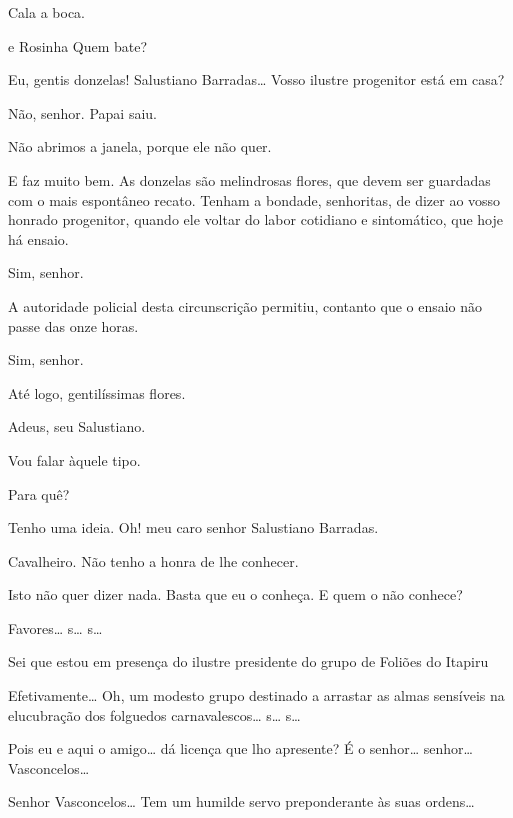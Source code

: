 \begin{linenumbers}
 Cala a boca.

 e {Rosinha}  
Quem bate?

 Eu, gentis
donzelas! Salustiano Barradas\ldots{} Vosso ilustre
progenitor está em casa?

 Não, senhor.
Papai saiu.

 Não abrimos a janela, porque ele
não quer.

 E faz muito
bem. As donzelas são melindrosas flores, que devem
ser guardadas com o mais espontâneo recato. Tenham a
bondade, senhoritas, de dizer ao vosso honrado progenitor, quando ele
voltar do labor cotidiano e sintomático, que hoje
há ensaio.

 Sim,
senhor.

 A autoridade
policial desta circunscrição permitiu, contanto que o
ensaio não passe das onze horas.

 Sim,
senhor.

 Até logo, gentilíssimas
flores.

 Adeus, seu Salustiano.

  Vou falar àquele tipo.

 Para quê?

 Tenho uma
ideia.  Oh! meu caro senhor Salustiano Barradas.

 Cavalheiro.
Não tenho a honra de lhe
conhecer.

 Isto não quer
dizer nada. Basta que eu o conheça. E quem o
não conhece?

 Favores\ldots{} s\ldots{} s\ldots{}

 Sei que estou em
presença do ilustre presidente do grupo de
Foliões do Itapiru

 Efetivamente\ldots{}  
Oh, um modesto grupo destinado a arrastar as almas sensíveis
na elucubração dos folguedos carnavalescos\ldots{} s\ldots{} s\ldots{}

 Pois eu e aqui o amigo\ldots{} 
dá licença que lho apresente? É o
senhor\ldots{} senhor\ldots{} Vasconcelos\ldots{}

 Senhor Vasconcelos\ldots{} Tem um
humilde servo preponderante às suas ordens\ldots{}


\end{linenumbers}
